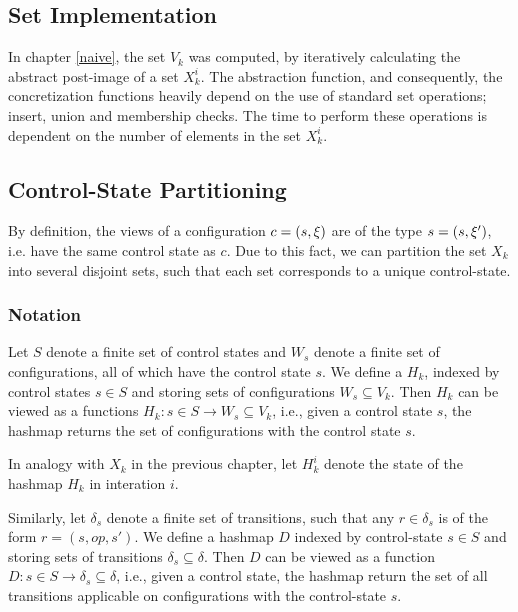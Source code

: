 \subsection{Set Implementation}
In chapter \ref{naive}, the set $V_k$ was computed, by iteratively calculating the abstract post-image of a set $X_k^i$. The abstraction function, and consequently, the concretization functions heavily depend on the use of standard set operations; insert, union and membership checks. The time to perform these operations is dependent on the number of elements in the set $X_k^i$.


\subsection{Control-State Partitioning}
By definition, the views of a configuration $c = (s, \xi)$ are of the type $s = (s, \xi')$, i.e. have the same control state as $c$. Due to this fact, we can partition the set $X_k$ into several disjoint sets, such that each set corresponds to a unique control-state.

\subsubsection{Notation}
Let $S$ denote a finite set of control states and $W_s$ denote a finite set of configurations, all of which have the control state $s$. We define a  $H_k$, indexed by control states $s \in S$ and storing sets of configurations $W_s \subseteq V_k$. Then $H_k$ can be viewed as a functions $H_k : s \in S \rightarrow W_s \subseteq V_k$, i.e., given a control state $s$, the hashmap returns the set of configurations with the control state $s$. 

In analogy with $X_k$ in the previous chapter, let $H_k^i$ denote the state of the hashmap $H_k$ in interation $i$.

Similarly, let $\delta_s$ denote a finite set of transitions, such that any $r \in \delta_s$ is of the form $r = (s, op, s')$. We define a hashmap $D$ indexed by control-state $s \in S$ and storing sets of transitions $\delta_s \subseteq \delta$. Then $D$ can be viewed as a function $D : s \in S \rightarrow \delta_s \subseteq \delta$, i.e., given a control state, the hashmap return the set of all transitions applicable on configurations with the control-state $s$.

